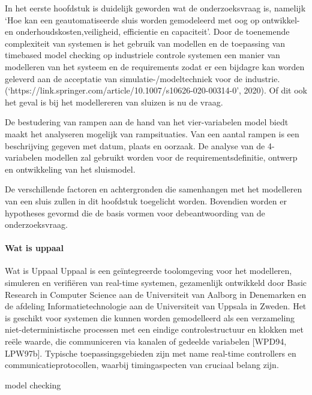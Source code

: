 
 




In het eerste hoofdstuk is duidelijk geworden wat de onderzoeksvraag is, namelijk ‘Hoe kan een geautomatiseerde sluis worden gemodeleerd met oog op ontwikkel- en onderhoudskosten,veiligheid, efficientie en capaciteit’. Door de toenemende complexiteit van systemen is het gebruik van modellen en de toepassing van timebased model checking  op industriele controle systemen een manier van modelleren van het systeem en de requirements zodat er een bijdagre kan worden geleverd aan de acceptatie van  simulatie-/modeltechniek voor de industrie.(‘https://link.springer.com/article/10.1007/s10626-020-00314-0’, 2020). Of dit ook het geval is bij het modellereren van sluizen is nu de vraag.

De bestudering van rampen aan de hand van het vier-variabelen model biedt maakt het analyseren mogelijk van rampsituaties. Van een aantal rampen is een beschrijving gegeven met datum, plaats en oorzaak. De analyse van de 4-variabelen modellen zal gebruikt worden voor de requirementsdefinitie, ontwerp en ontwikkeling van het sluismodel. 

De verschillende factoren en achtergronden die  samenhangen met het modelleren van een sluis zullen in dit hoofdstuk toegelicht worden. Bovendien worden er hypotheses gevormd die de basis vormen voor debeantwoording van de onderzoeksvraag. 




\paragraph{Wat is uppaal}

Wat is Uppaal
Uppaal is een geïntegreerde toolomgeving voor het modelleren, simuleren en verifiëren van real-time systemen, gezamenlijk ontwikkeld door Basic Research in Computer Science aan de Universiteit van Aalborg in Denemarken en de afdeling Informatietechnologie aan de Universiteit van Uppsala in Zweden. Het is geschikt voor systemen die kunnen worden gemodelleerd als een verzameling niet-deterministische processen met een eindige controlestructuur en klokken met reële waarde, die communiceren via kanalen of gedeelde variabelen [WPD94, LPW97b]. Typische toepassingsgebieden zijn met name real-time controllers en communicatieprotocollen, waarbij timingaspecten van cruciaal belang zijn. \cite{uppaalFeatures}


model checking

